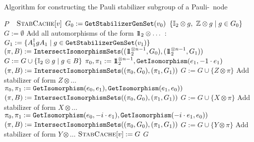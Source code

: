 %
\begin{algorithm}
    \caption{Algorithm for constructing the Pauli stabilizer subgroup of a Pauli-\limdd~node}
    \label{alg:getautomorphisms}
    \begin{algorithmic}[1]
        \label{line:stabalgo-first}
         \Return $P$ \Else \mbox{ } \Return \none
        \label{line:stabalgo-second}
        \EndIf
        \Else       
        \Return $\textsc{StabCache}[v]$
        \EndIf
         \State $G_0 := {\tt GetStabilizerGenSet}(v_0)$
       	     \State \Return $\left\lbrace \mathbb I_2\otimes g , ~ \mathbb Z\otimes g  \mid g\in G_0 \right\rbrace$
             \label{line:stab-fork}
        \Else
       	\State $G:= \emptyset$
        \Comment Add all automorphisms of the form $1\!\!1_2 \otimes \dots$ :
        \State $G_1 := \{A_1^{\dagger} g A_1 \mid g \in {\tt GetStabilizerGenSet}(v_1)\}$
        \State $(\pi, B):= {\tt IntersectIsomorphismSets}(( 1\!\!1_2^{\otimes n - 1}, G_0), ( 1\!\!1_2^{\otimes n - 1}, G_1))$
        \State $G := G \cup \left\lbrace \mathbb I_2\otimes g  \mid g\in B \right\rbrace$
        \State
        \State $\pi_0, \pi_1 := 1\!\!1_2^{\otimes n - 1}, \textnormal{{\tt GetIsomorphism}}(e_1,-1 \cdot e_1)$ 
        \State $(\pi, B):= {\tt IntersectIsomorphismSets}((\pi_0, G_0), (\pi_1, G_1))$
            $G := G \cup \{Z\otimes \pi\}$ 
     	         \Comment Add stabilizer of form $Z \otimes \dots$
     	 \EndIf
        \State
        \State $\pi_0, \pi_1 := \textnormal{{\tt GetIsomorphism}}(e_0,e_1), \textnormal{{\tt GetIsomorphism}}(e_1, e_0))$
        \State $(\pi, B):= {\tt IntersectIsomorphismSets}((\pi_0, G_0), (\pi_1, G_1))$
            $G := G \cup \{X\otimes \pi\}$ 
     	         \Comment Add stabilizer of form $X \otimes \dots$
     	 \EndIf 
        \State
        \State $\pi_0, \pi_1 := \textnormal{{\tt GetIsomorphism}}(e_0, -i \cdot e_1), \textnormal{{\tt GetIsomorphism}}(-i\cdot e_1, e_0))$
        \State $(\pi, B):= {\tt IntersectIsomorphismSets}((\pi_0, G_0), (\pi_1, G_1))$
            $G := G \cup \{Y\otimes \pi\}$ 
     	         \Comment Add stabilizer of form $Y \otimes \dots$
     	 \EndIf
        \EndIf
        \State $\textsc{StabCache}[v] := G$
        \label{line:autocache-store}
		\State \Return $G$
        \EndIf
        \EndProcedure
    \end{algorithmic}
\end{algorithm}

